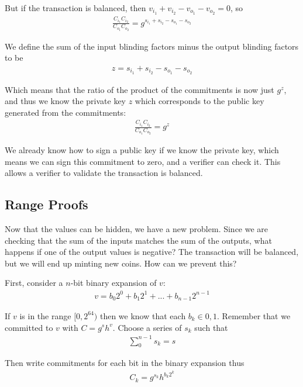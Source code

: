 \documentclass{article}
\begin{document}
But if the transaction is balanced, then $v_{i_1} + v_{i_2} - v_{o_1} - v_{o_2} =0$, so
\begin{eqnarray}
  \frac{C_{i_1} C_{i_2}}{C_{o_1} C_{o_2}} = g^{s_{i_1} + s_{i_2} - s_{o_1} - s_{o_2}}
\end{eqnarray}

We define the sum of the input blinding factors minus the output blinding factors to be
\begin{eqnarray}
  z = s_{i_1} + s_{i_2} - s_{o_1} - s_{o_2}
\end{eqnarray}

Which means that the ratio of the product of the commitments is now just $g^z$, and thus we know the private key $z$ which corresponds to the public key generated from the commitments:
\begin{eqnarray}
  \frac{C_{i_1} C_{i_2}}{C_{o_1} C_{o_2}} = g^z
\end{eqnarray}

We already know how to sign a public key if we know the private key, which means we can sign this commitment to zero, and a verifier can check it.  This allows a verifier to validate the transaction is balanced.


\subsection{Range Proofs}

Now that the values can be hidden, we have a new problem.  Since we are checking that the sum of the inputs matches the sum of the outputs, what happens if one of the output values is negative?  The transaction will be balanced, but we will end up minting new coins.  How can we prevent this?

First, consider a $n$-bit binary expansion of $v$:
\begin{eqnarray}
  v = b_0 2^0 + b_1 2^1 + ... + b_{n-1} 2^{n-1}
\end{eqnarray}

If $v$ is in the range $[0, 2^{64})$ then we know that each $b_k \in {0, 1}$.  Remember that we committed to $v$ with $C = g^s h^v$.  Choose a series of $s_k$ such that
\begin{eqnarray}
  \sum_0^{n-1} s_k = s 
\end{eqnarray}

Then write commitments for each bit in the binary expansion thus
\begin{eqnarray}
  C_k = g^{s_k} h^{b_k 2^k}
\end{eqnarray}
\end{document}
